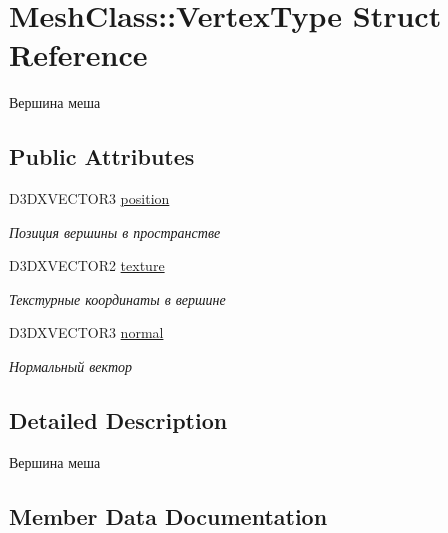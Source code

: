 \hypertarget{struct_mesh_class_1_1_vertex_type}{}\section{Mesh\+Class\+:\+:Vertex\+Type Struct Reference}
\label{struct_mesh_class_1_1_vertex_type}


Вершина меша  


\subsection*{Public Attributes}
\begin{DoxyCompactItemize}
\item 
D3\+D\+X\+V\+E\+C\+T\+O\+R3 \hyperlink{struct_mesh_class_1_1_vertex_type_a1a6431f79df56f423b71a20f71e8154c}{position}
\begin{DoxyCompactList}\small\item\em Позиция вершины в пространстве \end{DoxyCompactList}\item 
D3\+D\+X\+V\+E\+C\+T\+O\+R2 \hyperlink{struct_mesh_class_1_1_vertex_type_a3b5de88da6b8120a8d14adcd8ebf1538}{texture}
\begin{DoxyCompactList}\small\item\em Текстурные координаты в вершине \end{DoxyCompactList}\item 
D3\+D\+X\+V\+E\+C\+T\+O\+R3 \hyperlink{struct_mesh_class_1_1_vertex_type_a9e8557aad75f75cddfd770de8e951b07}{normal}
\begin{DoxyCompactList}\small\item\em Нормальный вектор \end{DoxyCompactList}\end{DoxyCompactItemize}


\subsection{Detailed Description}
Вершина меша 

\subsection{Member Data Documentation}
\mbox{\label{struct_mesh_class_1_1_vertex_type_a9e8557aad75f75cddfd770de8e951b07}} 
